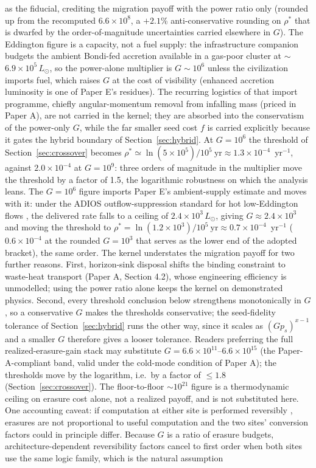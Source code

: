 \documentclass[11pt]{article}
\begin{document}
as the fiducial, crediting the migration payoff with the power ratio only (rounded up from the recomputed $6.6\times10^{8}$, a $+2.1$\% anti-conservative rounding on $\rho^{*}$ that is dwarfed by the order-of-magnitude uncertainties carried elsewhere in $G$). The Eddington figure is a capacity, not a fuel supply: the infrastructure companion \citep[hereafter Paper E]{Swanson2026Engineered} budgets the ambient Bondi-fed accretion available in a gas-poor cluster at $\sim$$6.9\times10^{5}\,L_\odot$, so the power-alone multiplier is $G \sim 10^{6}$ unless the civilization imports fuel, which raises $G$ at the cost of visibility (enhanced accretion luminosity is one of Paper E's residues). The recurring logistics of that import programme, chiefly angular-momentum removal from infalling mass (priced in Paper A), are not carried in the kernel; they are absorbed into the conservatism of the power-only $G$, while the far smaller seed cost $f$ is carried explicitly because it gates the hybrid boundary of Section~\ref{sec:hybrid}. At $G = 10^{6}$ the threshold of Section~\ref{sec:crossover} becomes $\rho^{*} \simeq \ln(5\times10^{5})/10^{5}\ \mathrm{yr} \approx 1.3\times10^{-4}$~yr$^{-1}$, against $2.0\times10^{-4}$ at $G = 10^{9}$: three orders of magnitude in the multiplier move the threshold by a factor of 1.5, the logarithmic robustness on which the analysis leans. The $G = 10^{6}$ figure imports Paper E's ambient-supply estimate and moves with it: under the ADIOS outflow-suppression standard for hot low-Eddington flows \citep{Swanson2026Engineered}, the delivered rate falls to a ceiling of $2.4\times10^{3}\,L_\odot$, giving $G \approx 2.4\times10^{3}$ and moving the threshold to $\rho^{*} = \ln(1.2\times10^{3})/10^{5}\ \mathrm{yr} \approx 0.7\times10^{-4}$~yr$^{-1}$ ($0.6\times10^{-4}$ at the rounded $G = 10^{3}$ that serves as the lower end of the adopted bracket), the same order. The kernel understates the migration payoff for two further reasons. First, horizon-sink disposal shifts the binding constraint to waste-heat transport (Paper A, Section 4.2), whose engineering efficiency is unmodelled; using the power ratio alone keeps the kernel on demonstrated physics. Second, every threshold conclusion below strengthens monotonically in $G$, so a conservative $G$ makes the thresholds conservative; the seed-fidelity tolerance of Section~\ref{sec:hybrid} runs the other way, since it scales as $(G p_{s})^{x-1}$ and a smaller $G$ therefore gives a looser tolerance. Readers preferring the full realized-erasure-gain stack may substitute $G = 6.6\times10^{11}$--$6.6\times10^{15}$ (the Paper-A-compliant band, valid under the cold-mode condition of Paper A); the thresholds move by the logarithm, i.e.\ by a factor of $\leq 1.8$ (Section~\ref{sec:crossover}). The floor-to-floor $\sim10^{21}$ figure is a thermodynamic ceiling on erasure cost alone, not a realized payoff, and is not substituted here. One accounting caveat: if computation at either site is performed reversibly \citep{Bennett1973}, erasures are not proportional to useful computation and the two sites' conversion factors could in principle differ. Because $G$ is a ratio of erasure budgets, architecture-dependent reversibility factors cancel to first order when both sites use the same logic family, which is the natural assumption 
\end{document}
